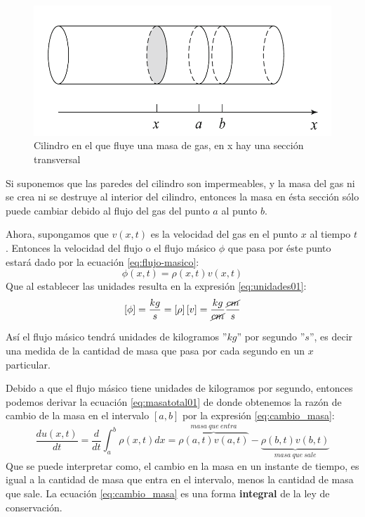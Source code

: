 \begin{figure}\label{fig:cilindro01}
    \centering
    \includegraphics[scale=0.5]{images/cilindro01}
    \caption{Cilindro en el que fluye una masa de gas, en x hay una sección transversal}
\end{figure}

Si suponemos que las paredes del cilindro son impermeables, y la masa del gas ni se crea ni se destruye
al interior del cilindro, entonces la masa en ésta sección sólo puede cambiar debido al flujo del gas
del punto $a$ al punto $b$.

Ahora, supongamos que $v(x,t)$ es la velocidad del gas en el punto $x$ al tiempo $t$.  Entonces la 
velocidad del flujo o el flujo másico $\phi$ que pasa por éste punto estará dado por la ecuación 
\eqref{eq:flujo-masico}:
\begin{equation}\label{eq:flujo-masico}
    \phi(x,t) = \rho(x,t)v(x,t)
\end{equation}
Que al establecer las unidades resulta en la expresión \eqref{eq:unidades01}:
\begin{equation}\label{eq:unidades01}
    \left[\phi\right]=\frac{kg}{s} = \left[\rho\right]\left[v\right]= \frac{kg}{\cancel{cm}}\frac{\cancel{cm}}{s}
\end{equation}

Así el flujo másico tendrá unidades de kilogramos ''$kg$'' por segundo ''$s$'', es decir una medida de la 
cantidad de masa que pasa por cada segundo en un $x$ particular.

Debido a que el flujo másico tiene unidades de kilogramos por segundo, entonces podemos derivar la 
ecuación \eqref{eq:masatotal01} de donde obtenemos la razón de cambio de la masa en el intervalo
$[a,b]$ por la expresión \eqref{eq:cambio_masa}:
\begin{equation}\label{eq:cambio_masa}
    \frac{d u(x,t)}{dt} = \frac{d}{dt}\int_a^b\rho(x,t)dx=\overbrace{\rho(a,t)v(a,t)}^{masa\ que\ entra}
    -\underbrace{\rho(b,t)v(b,t)}_{masa\ que\ sale}
\end{equation}
Que se puede interpretar como, el cambio en la masa en un instante de tiempo, es igual a la cantidad 
de masa que entra en el intervalo, menos la cantidad de masa que sale. La ecuación \eqref{eq:cambio_masa}
es una forma \textbf{integral} de la ley de conservación.
